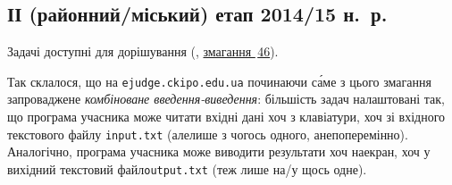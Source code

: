 \renewenvironment{problemAllDefault}[1]{\vspace{10mm}\par\begin{problem}{#1}{\stdinOrInputTxt}{\stdoutOrOutputTxt}{1 сек}{64 мегабайти}}{\end{problem}}

\subsection{ІІ (районний/міський) етап 2014/15 н.~р.}

Задачі доступні для дорішування (\EjudgeCkipoName, \href{https://ejudge.ckipo.edu.ua/cgi-bin/new-register?contest_id=46}{змагання \textnumero$\,$46}).

Так склалося, що на \texttt{ejudge.ckipo.edu.ua} починаючи с\'{а}ме з цього змагання запроваджене \emph{комбіноване введення-виведення}: більшість задач налаштовані так, що програма учасника може читати вхідні дані хоч з клавіатури, хоч зі вхідного текстового файлу \verb"input.txt" (але\nolinebreak[2] лише з чогось одного, а\nolinebreak[3] не\nolinebreak[2] поперемінно). Аналогічно, програма учасника може виводити результати хоч на\nolinebreak[3] екран, хоч у вихідний текстовий файл\nolinebreak[2] \verb"output.txt" (теж лише на/у щось одне).



	

	

	

	


